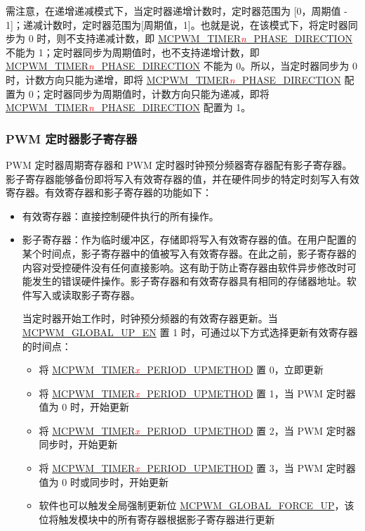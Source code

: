 \documentclass[main\_\_CN.tex]{subfiles}
\begin{document}
需注意，在递增递减模式下，当定时器递增计数时，定时器范围为 [0，周期值 - 1]；递减计数时，定时器范围为[周期值，1]。也就是说，在该模式下，将定时器同步为 0 时，则不支持递减计数，即 \hyperref[fielddesc:MCPWMTIMER0PHASEDIRECTION]{MCPWM\_TIMER\textcolor{red}{\it{n}}\_PHASE\_DIRECTION} 不能为 1；定时器同步为周期值时，也不支持递增计数，即 \hyperref[fielddesc:MCPWMTIMER0PHASEDIRECTION]{MCPWM\_TIMER\textcolor{red}{\it{n}}\_PHASE\_DIRECTION} 不能为 0。所以，当定时器同步为 0 时，计数方向只能为递增，即将 \hyperref[fielddesc:MCPWMTIMER0PHASEDIRECTION]{MCPWM\_TIMER\textcolor{red}{\it{n}}\_PHASE\_DIRECTION} 配置为 0；定时器同步为周期值时，计数方向只能为递减，即将 \hyperref[fielddesc:MCPWMTIMER0PHASEDIRECTION]{MCPWM\_TIMER\textcolor{red}{\it{n}}\_PHASE\_DIRECTION} 配置为 1。

\subsubsection{PWM 定时器影子寄存器}
\label{sec:mcpwm-shdw_reg}

PWM 定时器周期寄存器和 PWM 定时器时钟预分频器寄存器配有影子寄存器。影子寄存器能够备份即将写入有效寄存器的值，并在硬件同步的特定时刻写入有效寄存器。有效寄存器和影子寄存器的功能如下：
\begin{itemize}
    \item 有效寄存器：直接控制硬件执行的所有操作。
    \item 影子寄存器：作为临时缓冲区，存储即将写入有效寄存器的值。在用户配置的某个时间点，影子寄存器中的值被写入有效寄存器。在此之前，影子寄存器的内容对受控硬件没有任何直接影响。这有助于防止寄存器由软件异步修改时可能发生的错误硬件操作。影子寄存器和有效寄存器具有相同的存储器地址。软件写入或读取影子寄存器。
    
    当定时器开始工作时，时钟预分频器的有效寄存器更新。当 \hyperref[fielddesc:MCPWMGLOBALUPEN]{MCPWM\_GLOBAL\_UP\_EN} 置 1 时，可通过以下方式选择更新有效寄存器的时间点：
    \begin{itemize}
        \item 将 \hyperref[fielddesc:MCPWMTIMER0PERIODUPMETHOD]{MCPWM\_TIMER\textcolor{red}{\it{x}}\_PERIOD\_UPMETHOD} 置 0，立即更新
        \item 将 \hyperref[fielddesc:MCPWMTIMER0PERIODUPMETHOD]{MCPWM\_TIMER\textcolor{red}{\it{x}}\_PERIOD\_UPMETHOD} 置 1，当 PWM 定时器值为 0 时，开始更新
        \item 将 \hyperref[fielddesc:MCPWMTIMER0PERIODUPMETHOD]{MCPWM\_TIMER\textcolor{red}{\it{x}}\_PERIOD\_UPMETHOD} 置 2，当 PWM 定时器同步时，开始更新
        \item 将 \hyperref[fielddesc:MCPWMTIMER0PERIODUPMETHOD]{MCPWM\_TIMER\textcolor{red}{\it{x}}\_PERIOD\_UPMETHOD} 置 3，当 PWM 定时器值为 0 时或同步时，开始更新
        \item 软件也可以触发全局强制更新位 \hyperref[fielddesc:MCPWMGLOBALFORCEUP]{MCPWM\_GLOBAL\_FORCE\_UP}，该位将触发模块中的所有寄存器根据影子寄存器进行更新
    \end{itemize}
\end{itemize}
\end{document}
